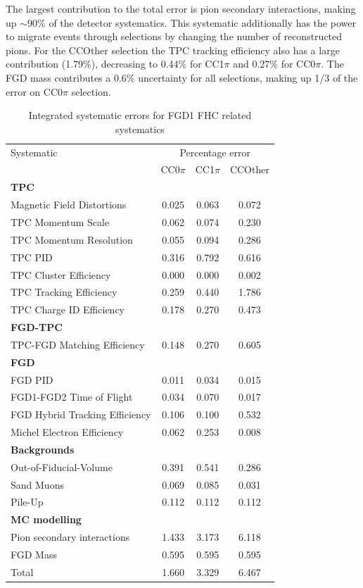 The largest contribution to the total error is pion secondary interactions, making up $\sim90\%$ of the detector systematics. This systematic additionally has the power to migrate events through selections by changing the number of reconstructed pions. For the CCOther selection the TPC tracking efficiency also has a large contribution (1.79\%), decreasing to 0.44\% for CC1$\pi$ and 0.27\% for CC0$\pi$. The FGD mass contributes a 0.6\% uncertainty for all selections, making up 1/3 of the error on CC0$\pi$ selection.
\begin{table}[h]
	\begin{tabular}{l | c c c}
		\hline
		\hline
		Systematic & \multicolumn{3}{c}{Percentage error} \\
				   & CC0$\pi$ & CC1$\pi$ & CCOther \\ 
		\hline	
		\multicolumn{4}{l}{\textbf{TPC}} \\
		Magnetic Field Distortions		& 0.025 & 0.063 & 0.072 \\
		TPC Momentum Scale				& 0.062 & 0.074 & 0.230 \\
		TPC Momentum Resolution			& 0.055 & 0.094 & 0.286 \\
		TPC PID							& 0.316 & 0.792 & 0.616 \\
		TPC Cluster Efficiency			& 0.000 & 0.000 & 0.002 \\
		TPC Tracking Efficiency			& 0.259 & 0.440 & 1.786 \\
		TPC Charge ID Efficiency		& 0.178 & 0.270 & 0.473 \\
		\hline 
		\multicolumn{4}{l}{\textbf{FGD-TPC}} \\
		TPC-FGD Matching Efficiency		& 0.148 & 0.270 & 0.605 \\
		\hline
		\multicolumn{4}{l}{\textbf{FGD}} \\
		FGD PID							& 0.011 & 0.034 & 0.015 \\
		FGD1-FGD2 Time of Flight		& 0.034 & 0.070 & 0.017 \\
		FGD Hybrid Tracking Efficiency	& 0.106 & 0.100 & 0.532 \\
		Michel Electron Efficiency		& 0.062 & 0.253 & 0.008 \\
		\hline
		\multicolumn{4}{l}{\textbf{Backgrounds}} \\
		Out-of-Fiducial-Volume			& 0.391 & 0.541 & 0.286 \\
		Sand Muons						& 0.069 & 0.085 & 0.031 \\
		Pile-Up							& 0.112 & 0.112 & 0.112 \\
		\hline
		\multicolumn{4}{l}{\textbf{MC modelling}} \\
		Pion secondary interactions		& 1.433 & 3.173 & 6.118 \\
		FGD Mass						& 0.595 & 0.595 & 0.595 \\
		\hline
		Total & 1.660 & 3.329 & 6.467 \\
		\hline
		\hline
	\end{tabular}
\caption{Integrated systematic errors for FGD1 FHC related systematics}
\label{tab:nd280_syst_error_nu}
\end{table}
